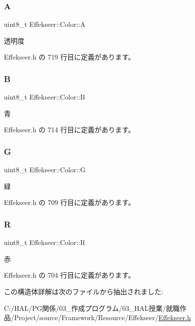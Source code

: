 \subsubsection{\texorpdfstring{A}{A}}
{\footnotesize\ttfamily uint8\+\_\+t Effekseer\+::\+Color\+::A}



透明度 



 Effekseer.\+h の 719 行目に定義があります。

\mbox{\label{struct_effekseer_1_1_color_a0313689224c549471daa2bfe58839d84}} 
\subsubsection{\texorpdfstring{B}{B}}
{\footnotesize\ttfamily uint8\+\_\+t Effekseer\+::\+Color\+::B}



青 



 Effekseer.\+h の 714 行目に定義があります。

\mbox{\label{struct_effekseer_1_1_color_a6d82d496ac86f8ac07ec0e8710126ef9}} 
\subsubsection{\texorpdfstring{G}{G}}
{\footnotesize\ttfamily uint8\+\_\+t Effekseer\+::\+Color\+::G}



緑 



 Effekseer.\+h の 709 行目に定義があります。

\mbox{\label{struct_effekseer_1_1_color_aae98e2323761b1b2b2d9d182e3af3b40}} 
\subsubsection{\texorpdfstring{R}{R}}
{\footnotesize\ttfamily uint8\+\_\+t Effekseer\+::\+Color\+::R}



赤 



 Effekseer.\+h の 704 行目に定義があります。



この構造体詳解は次のファイルから抽出されました\+:\begin{DoxyCompactItemize}
\item 
C\+:/\+H\+A\+L/\+P\+G関係/03\+\_\+作成プログラム/03\+\_\+\+H\+A\+L授業/就職作品/\+Project/source/\+Framework/\+Resource/\+Effekseer/\mbox{\hyperlink{_effekseer_8h}{Effekseer.\+h}}\end{DoxyCompactItemize}
